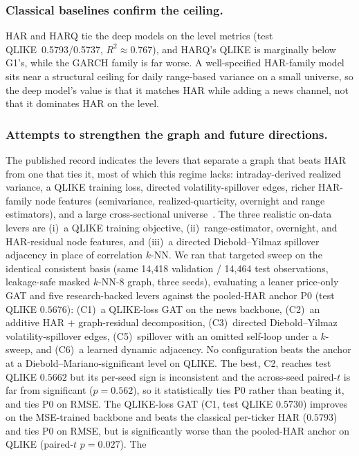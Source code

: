 \documentclass[runningheads]{llncs}
\newcommand{\HARtestQ}{0.5793}   %
\newcommand{\HARQtestQ}{0.5737}  %
\newcommand{\nval}{14{,}418}
\newcommand{\ntest}{14{,}464}
\begin{document}
\subsubsection{Classical baselines confirm the ceiling.}
HAR and HARQ tie the deep models on the level metrics (test QLIKE~\HARtestQ/\HARQtestQ, $R^2\approx0.767$),
and HARQ's QLIKE is marginally below G1's, while the GARCH family is far worse. A well-specified HAR-family
model sits near a structural ceiling for daily range-based variance on a small universe, so the deep
model's value is that it matches HAR while adding a news channel, not that it dominates HAR on the level.

\subsubsection{Attempts to strengthen the graph and future directions.}
The published record indicates the levers that separate a graph that beats HAR from one that ties it, most
of which this regime lacks: intraday-derived realized variance, a QLIKE training loss, directed
volatility-spillover edges, richer HAR-family node features (semivariance, realized-quarticity, overnight
and range estimators), and a large cross-sectional universe~\cite{zhang2025gnnhar,audrino2025,bpq2016}. The
three realistic on-data levers are (i)~a QLIKE training objective, (ii)~range-estimator, overnight, and
HAR-residual node features, and (iii)~a directed Diebold--Yilmaz spillover adjacency in place of
correlation $k$-NN. We ran that targeted sweep on the identical consistent basis (same \nval{}
validation / \ntest{} test observations, leakage-safe masked $k$-NN-8 graph, three seeds), evaluating a
leaner price-only GAT and five research-backed levers against the pooled-HAR anchor P0 (test QLIKE
$0.5676$): (C1)~a QLIKE-loss GAT on the news backbone, (C2)~an additive HAR $+$ graph-residual
decomposition, (C3)~directed Diebold--Yilmaz volatility-spillover edges, (C5)~spillover with an omitted
self-loop under a $k$-sweep, and (C6)~a learned dynamic adjacency. No configuration beats the anchor at a
Diebold--Mariano-significant level on QLIKE. The best, C2, reaches test QLIKE $0.5662$ but its per-seed
sign is inconsistent and the across-seed paired-$t$ is far from significant ($p=0.562$), so it
statistically ties P0 rather than beating it, and ties P0 on RMSE. The QLIKE-loss GAT (C1, test QLIKE
$0.5730$) improves on the MSE-trained backbone and beats the classical per-ticker HAR ($0.5793$) and ties
P0 on RMSE, but is significantly worse than the pooled-HAR anchor on QLIKE (paired-$t$ $p=0.027$). The
\end{document}
